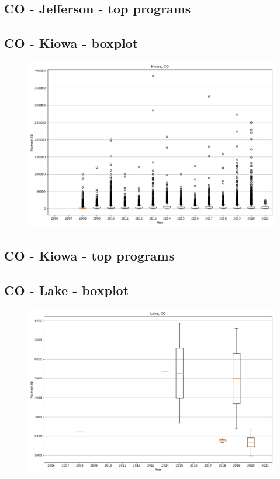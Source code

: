 \subsection*{CO - Jefferson - top programs}

\newpage
\subsection*{CO - Kiowa - boxplot}
\begin{figure}[h]
\centering
\includegraphics[width=7in]{../output/boxplots/counties/Kiowa-CO_boxplot.png}
\end{figure}


\subsection*{CO - Kiowa - top programs}

\newpage
\subsection*{CO - Lake - boxplot}
\begin{figure}[h]
\centering
\includegraphics[width=7in]{../output/boxplots/counties/Lake-CO_boxplot.png}
\end{figure}


